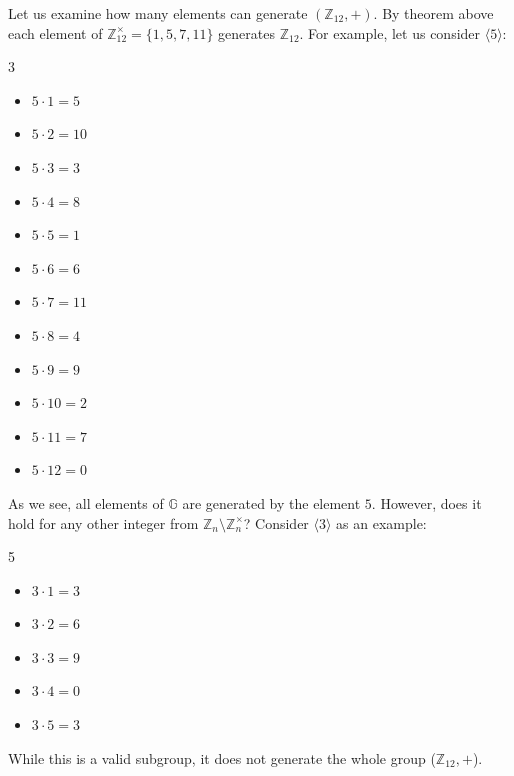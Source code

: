 \documentclass[../../book.tex]{subfiles}
\begin{document}
\begin{example}
    Let us examine how many elements can generate $(\mathbb{Z}_{12}, +)$. By
    theorem above each element of $\mathbb{Z}_{12}^{\times} = \{1, 5, 7, 11\}$
    generates $\mathbb{Z}_{12}$. For example, let us consider $\langle 5
    \rangle$:
    \begin{xmulticols}{3}
        \begin{itemize}
            \item $5 \cdot 1 = 5$
            \item $5 \cdot 2 = 10$
            \item $5 \cdot 3 = 3$
            \item $5 \cdot 4 = 8$
            
            \item $5 \cdot 5 = 1$
            \item $5 \cdot 6 = 6$
            \item $5 \cdot 7 = 11$
            \item $5 \cdot 8 = 4$
            
            \item $5 \cdot 9 = 9$
            \item $5 \cdot 10 = 2$
            \item $5 \cdot 11 = 7$
            \item $5 \cdot 12 = 0$
        \end{itemize}        
    \end{xmulticols}

    As we see, all elements of $\mathbb{G}$ are generated by the element $5$.
    However, does it hold for any other integer from $\mathbb{Z}_n \setminus
    \mathbb{Z}_n^{\times}$? Consider $\langle 3 \rangle$ as an example:
    \small
    \begin{xmulticols}{5}
        \begin{itemize}
            \item $3 \cdot 1 = 3$
            \item $3 \cdot 2 = 6$
            \item $3 \cdot 3 = 9$
            \item $3 \cdot 4 = 0$
            \item $3 \cdot 5 = 3$
        \end{itemize}
    \end{xmulticols} 
    \normalsize

    While this is a valid subgroup, it does not generate the whole group
    ($\mathbb{Z}_{12}, +$).
\end{example}
\end{document}

